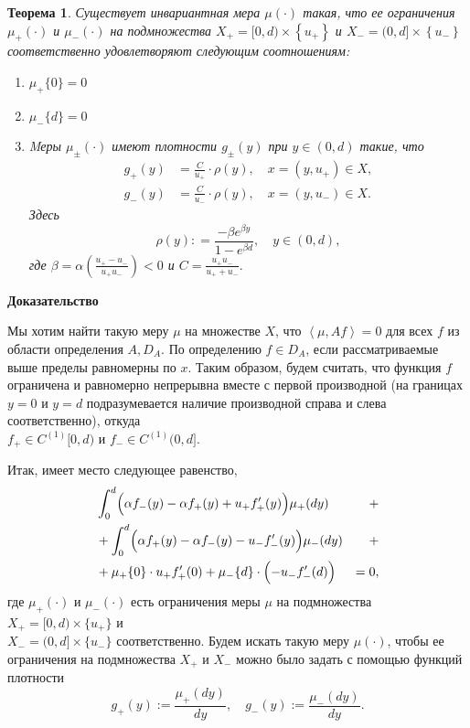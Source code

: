 \documentclass[12pt,a4paper]{article}
\newtheorem{theorem}{Теорема}
\begin{document}
\begin{theorem}
Существует инвариантная мера $\mu (\cdot)$ такая, что ее ограничения $\mu_+(\cdot)$ и $\mu_- (\cdot)$ на подмножества $X_+ = [0, d) \times \left\{u_+\right\}$ и $X_- = (0, d] \times \left\{u_-\right\}$ соответственно удовлетворяют следующим соотношениям:
\begin{enumerate}
\item $\mu_+ \{0\} = 0$
\item $\mu_- \{d\} = 0$
\item Mеры $\mu_\pm (\cdot)$ имеют плотности $g_\pm (y)$ при $y \in (0, d)$ такие, что
\begin{equation*}
    \begin{aligned}
        g_+ (y) &= \frac{C}{u_+} \cdot \rho (y), \quad x = ( y, u_+) \in X,\\
g_-(y) &= \frac{C}{u_-} \cdot \rho (y), \quad x = ( y, u_- ) \in X.
    \end{aligned}
\end{equation*}
Здесь 
$$\rho (y) : = \frac{- \beta e^{\beta y}}{1 - e^{\beta d}}, \quad y \in (0, d),$$
где $\beta = \alpha \left( \displaystyle\frac{u_+ - u_-}{u_+ u_-}\right) < 0$ и $C = \displaystyle\frac{u_+ u_-}{u_+ + u_-}.$

\end{enumerate}
\end{theorem}
{\bf Доказательство}

Мы хотим найти такую меру $\mu$ на множестве $X$, что $\left< \mu, A f\right> = 0$ для всех $f$ из области определения $A, D_A$. По определению $f \in D_A$, если рассматриваемые выше пределы равномерны по $x$. Таким образом, будем считать, что функция $f$ ограничена и равномерно непрерывна вместе с первой производной (на границах $y = 0$ и $y = d$ подразумевается наличие производной справа и слева соответственно), откуда \\$f_+ \in C^{(1)} [0, d)$ и $f_- \in C^{(1)} (0, d]$. 

Итак, имеет место следующее равенство,
\begin{equation}\label{2}
\begin{aligned}
&\int_0^d \Bigl( \alpha f_- (y) - \alpha f_+ (y) + u_+ f_+' (y) \Bigr) \mu_+ (dy) & + \\
 &+ \int_0^d \Bigl( \alpha f_+ (y) - \alpha f_- (y) - u_- f_-' (y) \Bigr) \mu_- (dy) & + \\
 &+ \mu_+ \{0\} \cdot u_+ f_+' (0) + \mu_- \{d\} \cdot \Bigl( - u_- f_-' (d)\Bigr)  & = 0 ,
\end{aligned}
\end{equation}
где $\mu_+(\cdot)$ и $\mu_- (\cdot)$ есть ограничения меры $\mu$ на подмножества $X_+ = [0, d) \times \{u_+\}$ и \\$X_- = (0, d] \times \{u_-\}$ соответственно. Будем искать такую меру $\mu (\cdot)$, чтобы ее ограничения на подмножества $X_+$ и $X_-$ можно было задать с помощью функций плотности
$$g_+ (y) := \frac{\mu_+ (dy)}{dy}, \quad g_- (y) := \frac{\mu_- (dy)}{dy}.$$
\end{document}
